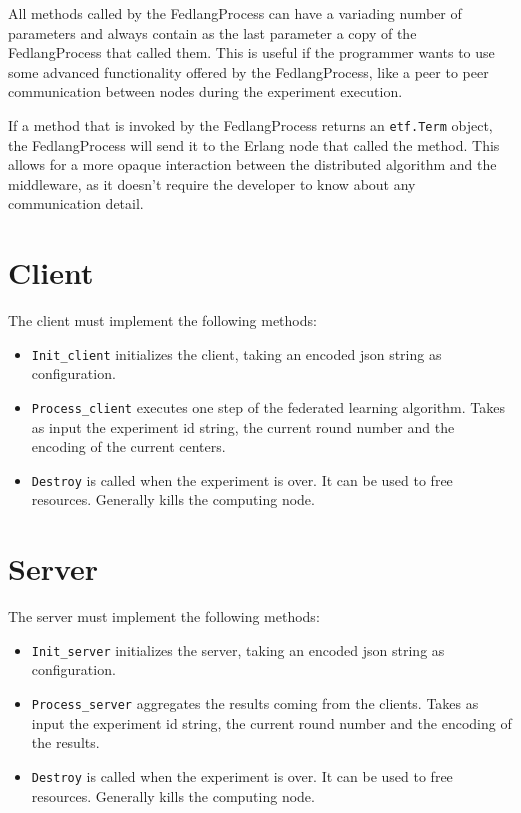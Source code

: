 All methods called by the FedlangProcess can have a variading number of parameters and always contain as the last parameter a copy of the FedlangProcess that called them. This is useful if the programmer wants to use some advanced functionality offered by the FedlangProcess, like a peer to peer communication between nodes during the experiment execution.

If a method that is invoked by the FedlangProcess returns an \texttt{etf.Term} object, the FedlangProcess will send it to the Erlang node that called the method. This allows for a more opaque interaction between the distributed algorithm and the middleware, as it doesn't require the developer to know about any communication detail.

\section{Client}
The client must implement the following methods:
\begin{itemize}
	\item \texttt{Init\_client} initializes the client, taking an encoded json string as configuration.
	\item \texttt{Process\_client} executes one step of the federated learning algorithm. Takes as input the experiment id string, the current round number and the encoding of the current centers.
	\item \texttt{Destroy} is called when the experiment is over. It can be used to free resources. Generally kills the computing node.
\end{itemize}

\section{Server}
The server must implement the following methods:
\begin{itemize}
	\item \texttt{Init\_server} initializes the server, taking an encoded json string as configuration.
	\item \texttt{Process\_server} aggregates the results coming from the clients. Takes as input the experiment id string, the current round number and the encoding of the results.
	\item \texttt{Destroy} is called when the experiment is over. It can be used to free resources. Generally kills the computing node.
\end{itemize}

